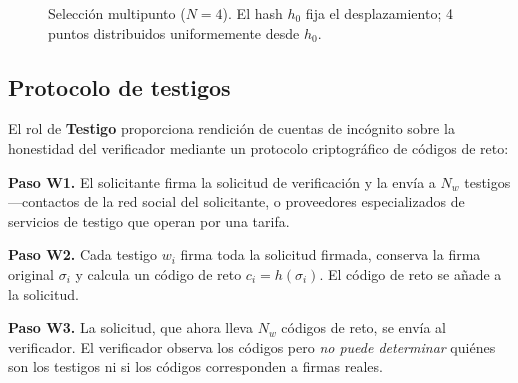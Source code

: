 \documentclass[11pt,a4paper,twocolumn]{article}
\begin{document}
\begin{figure}[ht]
\centering
{}
\caption{Selección multipunto ($N{=}4$). El hash $h_0$ fija el desplazamiento; 4 puntos distribuidos uniformemente desde $h_0$.}
\label{fig:multipoint}
\end{figure}

\subsection{Protocolo de testigos}

El rol de \textbf{Testigo} proporciona rendición de cuentas de incógnito sobre la honestidad del verificador mediante un protocolo criptográfico de códigos de reto:

\textbf{Paso W1.} El solicitante firma la solicitud de verificación y la envía a $N_w$ testigos---contactos de la red social del solicitante, o proveedores especializados de servicios de testigo que operan por una tarifa.

\textbf{Paso W2.} Cada testigo $w_i$ firma toda la solicitud firmada, conserva la firma original $\sigma_i$ y calcula un código de reto $c_i = h(\sigma_i)$. El código de reto se añade a la solicitud.

\textbf{Paso W3.} La solicitud, que ahora lleva $N_w$ códigos de reto, se envía al verificador. El verificador observa los códigos pero \emph{no puede determinar} quiénes son los testigos ni si los códigos corresponden a firmas reales.
\end{document}
